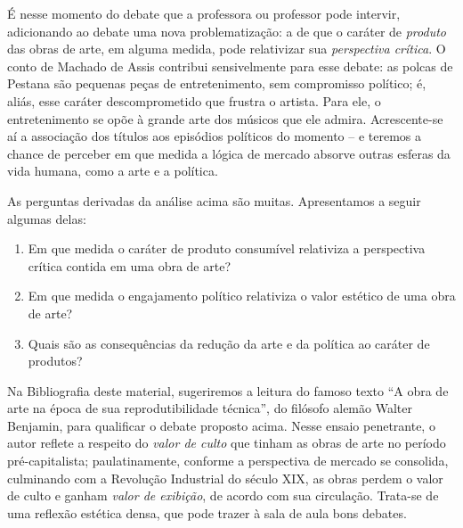 \documentclass[11pt]{extarticle}
\begin{document}
É nesse momento do debate que a professora ou professor pode intervir,
adicionando ao debate uma nova problematização: a de que o caráter de
\emph{produto} das obras de arte, em alguma medida, pode relativizar sua
\emph{perspectiva crítica}. O conto de Machado de Assis contribui
sensivelmente para esse debate: as polcas de Pestana são pequenas peças
de entretenimento, sem compromisso político; é, aliás, esse caráter
descomprometido que frustra o artista. Para ele, o entretenimento se
opõe à grande arte dos músicos que ele admira. Acrescente-se aí a
associação dos títulos aos episódios políticos do momento -- e teremos a
chance de perceber em que medida a lógica de mercado absorve outras
esferas da vida humana, como a arte e a política.

As perguntas derivadas da análise acima são muitas. Apresentamos a
seguir algumas delas:

\begin{enumerate}
\item Em que medida o caráter de produto consumível relativiza a
perspectiva crítica contida em uma obra de arte?

\item Em que medida o engajamento político relativiza o valor estético de
uma obra de arte?

\item Quais são as consequências da redução da arte e da política ao
caráter de produtos?
\end{enumerate}

Na Bibliografia deste material, sugeriremos a leitura do famoso texto
``A obra de arte na época de sua reprodutibilidade técnica'', do
filósofo alemão Walter Benjamin, para qualificar o debate proposto
acima. Nesse ensaio penetrante, o autor reflete a respeito do
\emph{valor de culto} que tinham as obras de arte no período
pré-capitalista; paulatinamente, conforme a perspectiva de mercado se
consolida, culminando com a Revolução Industrial do século XIX, as obras
perdem o valor de culto e ganham \emph{valor de exibição}, de acordo com
sua circulação. Trata-se de uma reflexão estética densa, que pode trazer
à sala de aula bons debates.
\end{document}
